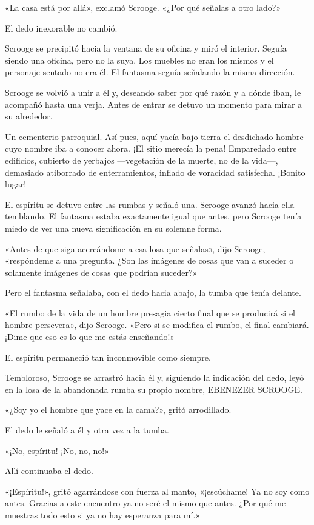 \documentclass{novela}
\begin{document}
 «La casa está por allá», exclamó Scrooge. «¿Por qué señalas a otro lado?»

 El dedo inexorable no cambió.

 Scrooge se precipitó hacia la ventana de su oficina y miró el interior. Seguía siendo una oficina, pero no la suya. Los muebles no eran los mismos y el personaje sentado no era él. El fantasma seguía señalando la misma dirección.

 Scrooge se volvió a unir a él y, deseando saber por qué razón y a dónde iban, le acompañó hasta una verja. Antes de entrar se detuvo un momento para mirar a su alrededor.

 Un cementerio parroquial. Así pues, aquí yacía bajo tierra el desdichado hombre cuyo nombre iba a conocer ahora. ¡El sitio merecía la pena! Emparedado entre edificios, cubierto de yerbajos ---vegetación de la muerte, no de la vida---, demasiado atiborrado de enterramientos, inflado de voracidad satisfecha. ¡Bonito lugar!

 El espíritu se detuvo entre las rumbas y señaló una. Scrooge avanzó hacia ella temblando. El fantasma estaba exactamente igual que antes, pero Scrooge tenía miedo de ver una nueva significación en su solemne forma.

 «Antes de que siga acercándome a esa losa que señalas», dijo Scrooge, «respóndeme a una pregunta. ¿Son las imágenes de cosas que van a suceder o solamente imágenes de cosas que podrían suceder?»

 Pero el fantasma señalaba, con el dedo hacia abajo, la tumba que tenía delante.

 «El rumbo de la vida de un hombre presagia cierto final que se producirá si el hombre persevera», dijo Scrooge. «Pero si se modifica el rumbo, el final cambiará. ¡Dime que eso es lo que me estás enseñando!»

 El espíritu permaneció tan inconmovible como siempre.

 Tembloroso, Scrooge se arrastró hacia él y, siguiendo la indicación del dedo, leyó en la losa de la abandonada rumba su propio nombre, EBENEZER SCROOGE\@.

 «¿Soy yo el hombre que yace en la cama?», gritó arrodillado.

 El dedo le señaló a él y otra vez a la tumba.

 «¡No, espíritu! ¡No, no, no!»

 Allí continuaba el dedo.

 «¡Espíritu!», gritó agarrándose con fuerza al manto, «¡escúchame! Ya no soy como antes. Gracias a este encuentro ya no seré el mismo que antes. ¿Por qué me muestras todo esto si ya no hay esperanza para mí.»
\end{document}
